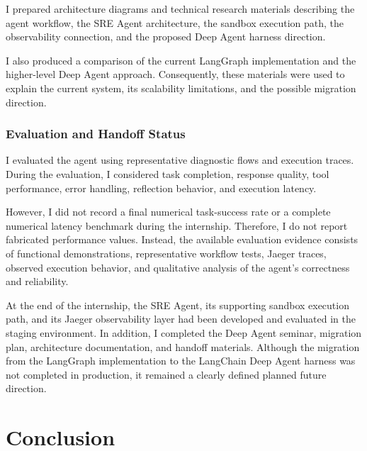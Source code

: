 \documentclass[a4paper]{article}
\theoremstyle{definition}
\begin{document}
I prepared architecture diagrams and technical research materials describing the agent workflow, the SRE Agent architecture, the sandbox execution path, the observability connection, and the proposed Deep Agent harness direction.

I also produced a comparison of the current LangGraph implementation and the higher-level Deep Agent approach. Consequently, these materials were used to explain the current system, its scalability limitations, and the possible migration direction.

\subsubsection{Evaluation and Handoff Status}

I evaluated the agent using representative diagnostic flows and execution traces. During the evaluation, I considered task completion, response quality, tool performance, error handling, reflection behavior, and execution latency.

However, I did not record a final numerical task-success rate or a complete numerical latency benchmark during the internship. Therefore, I do not report fabricated performance values. Instead, the available evaluation evidence consists of functional demonstrations, representative workflow tests, Jaeger traces, observed execution behavior, and qualitative analysis of the agent's correctness and reliability.

At the end of the internship, the SRE Agent, its supporting sandbox execution path, and its Jaeger observability layer had been developed and evaluated in the staging environment. In addition, I completed the Deep Agent seminar, migration plan, architecture documentation, and handoff materials. Although the migration from the LangGraph implementation to the LangChain Deep Agent harness was not completed in production, it remained a clearly defined planned future direction.

\newpage
\section{Conclusion}
    
\end{document}

